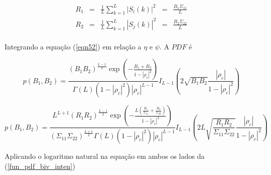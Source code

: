 \documentclass[remotesensing,article,submit,moreauthors,pdftex]{Definitions/mdpi}
\begin{document}
\begin{equation}\label{eqn59}
\begin{array}{ccccc}
	R_1&=&\frac{1}{L}\sum_{k=1}^{L}|S_i(k)|^2&=&\frac{B_1\Sigma_{11}}{L}\\
	R_2&=&\frac{1}{L}\sum_{k=1}^{L}|S_j(k)|^2&=&\frac{B_2\Sigma_{22}}{L}\\
\end{array}
\end{equation}

Integrando a equação (\ref{eqn52}) em relação a $\eta$ e $\psi$. A $PDF$ é

\begin{equation}\label{eqn60}
	p(B_1,B_2)=\frac{\left(B_1B_2\right)^{\frac{L-1}{2}}\exp\left(-\frac{B_1+B_2}{1-|\rho_c|^2}\right)}{\Gamma(L)(1-|\rho_c|^2)|\rho_c|^{L-1}}I_{L-1}\left(2\sqrt{B_1B_2}\frac{|\rho_c|}{1-|\rho_c|^2}\right)
\end{equation}


\begin{equation}\label{fun_pdf_biv_inten}
	p(B_1,B_2)=\frac{L^{L+1}\left(R_1R_2\right)^{\frac{L-1}{2}}\exp\left(-\frac{L(\frac{R_1}{\Sigma_{11}}+\frac{R_2}{\Sigma_{22}})}{1-|\rho_c|^2}\right)}{(\Sigma_{11}\Sigma_{22})^{\frac{L+1}{2}}\Gamma(L)(1-|\rho_c|^2)|\rho_c|^{L-1}}I_{L-1}\left(2L\sqrt{\frac{R_1R_2}{\Sigma_{11}\Sigma_{22}}}\frac{|\rho_c|}{1-|\rho_c|^2}\right)
\end{equation}

Aplicando o logaritmo natural na equação em ambos os lados da  (\ref{fun_pdf_biv_inten})
\end{document}

